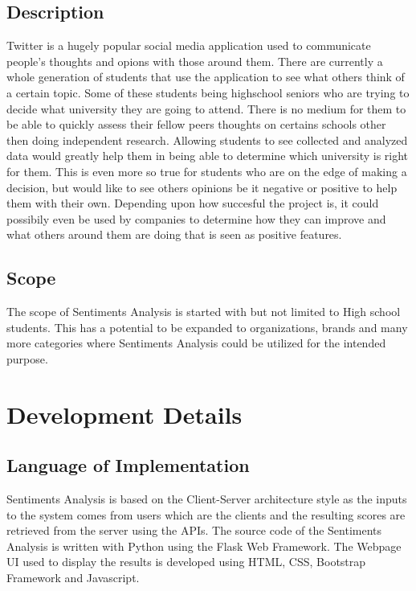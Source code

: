 \documentclass[12pt, titlepage]{article}
\begin{document}
\subsection{Description}
Twitter is a hugely popular social media application used to communicate people's thoughts
and opions with those around them. There are currently a whole generation of students that
use the application to see what others think of a certain topic. Some of these students being
highschool seniors who are trying to decide what university they are going to attend. There
is no medium for them to be able to quickly assess their fellow peers thoughts on certains
schools other then doing independent research.
Allowing students to see collected and analyzed data would greatly help them in being able
to determine which university is right for them. This is even more so true for students who
are on the edge of making a decision, but would like to see others opinions be it negative or
positive to help them with their own. Depending upon how succesful the project is, it could
possibily even be used by companies to determine how they can improve and what others
around them are doing that is seen as positive features.

\subsection{Scope}
The scope of Sentiments Analysis is started with but not limited to High school students. This has a potential to be expanded to organizations, brands and many more categories where Sentiments Analysis could be utilized for the intended purpose.

\newpage

\section{Development Details}
\subsection{Language of Implementation}
Sentiments Analysis is based on the Client-Server architecture style as the inputs to the system comes from users which are the clients and the resulting scores are retrieved from the server using the APIs. The source code of the Sentiments Analysis is written with Python using the Flask Web Framework. The Webpage UI used to display the results is developed using HTML, CSS, Bootstrap Framework and Javascript.
\end{document}
